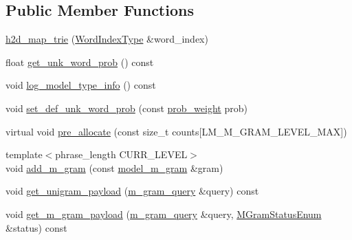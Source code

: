 \subsection*{Public Member Functions}
\begin{DoxyCompactItemize}
\item 
\hyperlink{classuva_1_1smt_1_1bpbd_1_1server_1_1lm_1_1h2d__map__trie_a7de8ae74285d7ad4de6b738110662180}{h2d\+\_\+map\+\_\+trie} (\hyperlink{classuva_1_1smt_1_1bpbd_1_1server_1_1lm_1_1word__index__trie__base_a64279b5b94c421b25aedaa72e73d013c}{Word\+Index\+Type} \&word\+\_\+index)
\item 
float \hyperlink{classuva_1_1smt_1_1bpbd_1_1server_1_1lm_1_1h2d__map__trie_acbe50814d904adfa75abaa3bb10b56dd}{get\+\_\+unk\+\_\+word\+\_\+prob} () const 
\item 
void \hyperlink{classuva_1_1smt_1_1bpbd_1_1server_1_1lm_1_1h2d__map__trie_a66432928248155f886dedc326b440fdb}{log\+\_\+model\+\_\+type\+\_\+info} () const 
\item 
void \hyperlink{classuva_1_1smt_1_1bpbd_1_1server_1_1lm_1_1h2d__map__trie_a0e3c9f4dcc07ddb646f90f72bf29dcfd}{set\+\_\+def\+\_\+unk\+\_\+word\+\_\+prob} (const \hyperlink{namespaceuva_1_1smt_1_1bpbd_1_1server_a01e9ea4de9c226f4464862e84ff0bbcc}{prob\+\_\+weight} prob)
\item 
virtual void \hyperlink{classuva_1_1smt_1_1bpbd_1_1server_1_1lm_1_1h2d__map__trie_a89337890858c8b512b1aa96f135f9f0c}{pre\+\_\+allocate} (const size\+\_\+t counts\mbox{[}L\+M\+\_\+\+M\+\_\+\+G\+R\+A\+M\+\_\+\+L\+E\+V\+E\+L\+\_\+\+M\+A\+X\mbox{]})
\item 
{\footnotesize template$<$phrase\+\_\+length C\+U\+R\+R\+\_\+\+L\+E\+V\+E\+L$>$ }\\void \hyperlink{classuva_1_1smt_1_1bpbd_1_1server_1_1lm_1_1h2d__map__trie_a1c4e58dbeba591e47f0ed873ea169920}{add\+\_\+m\+\_\+gram} (const \hyperlink{classuva_1_1smt_1_1bpbd_1_1server_1_1lm_1_1m__grams_1_1model__m__gram}{model\+\_\+m\+\_\+gram} \&gram)
\item 
void \hyperlink{classuva_1_1smt_1_1bpbd_1_1server_1_1lm_1_1h2d__map__trie_a1b844f761b0ccd25c6085f5a886d1235}{get\+\_\+unigram\+\_\+payload} (\hyperlink{classuva_1_1smt_1_1bpbd_1_1server_1_1lm_1_1m__gram__query}{m\+\_\+gram\+\_\+query} \&query) const 
\item 
void \hyperlink{classuva_1_1smt_1_1bpbd_1_1server_1_1lm_1_1h2d__map__trie_a12a0e179c203e4b2a583587008fbb338}{get\+\_\+m\+\_\+gram\+\_\+payload} (\hyperlink{classuva_1_1smt_1_1bpbd_1_1server_1_1lm_1_1m__gram__query}{m\+\_\+gram\+\_\+query} \&query, \hyperlink{namespaceuva_1_1smt_1_1bpbd_1_1server_1_1lm_ab9b3e7382b561dcb8abcd6b55e9b796a}{M\+Gram\+Status\+Enum} \&status) const 

\end{DoxyCompactItemize}
